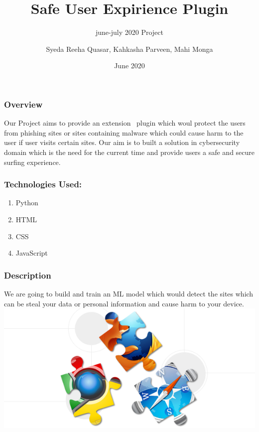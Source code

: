 \documentclass[14pt]{beamer}
\title[SUE]{Safe User Expirience Plugin}
\subtitle{june-july 2020 Project}
\author[Team 36]{Syeda Reeha Quasar, Kahkasha Parveen, Mahi Monga}
\date{June 2020}
\begin{document}
\begin{frame}
    \titlepage
\end{frame}

\begin{frame}
    \frametitle{Overview}
    Our Project aims to provide an extension \ plugin which woul protect the users from phishing sites or sites containing malware which could cause harm to the user if user visits certain sites.
    Our aim is to built a solution in cybersecurity domain which is the need for the current time and provide users a safe and secure surfing experience.
\end{frame}

\begin{frame}
    \frametitle{Technologies Used:}
    \begin{enumerate}
        \item{Python}
        \item{HTML}
        \item{CSS}
        \item{JavaScript}
    \end{enumerate}
\end{frame}

\begin{frame}
    \frametitle{Description}
    We are going to build and train an ML model which would detect the sites which can be steal your data or personal information and cause harm to your device.
    \includegraphics{imag}
    \href{https://developer.chrome.com/extensions/getstarted}{}
\end{frame}
\end{document}
